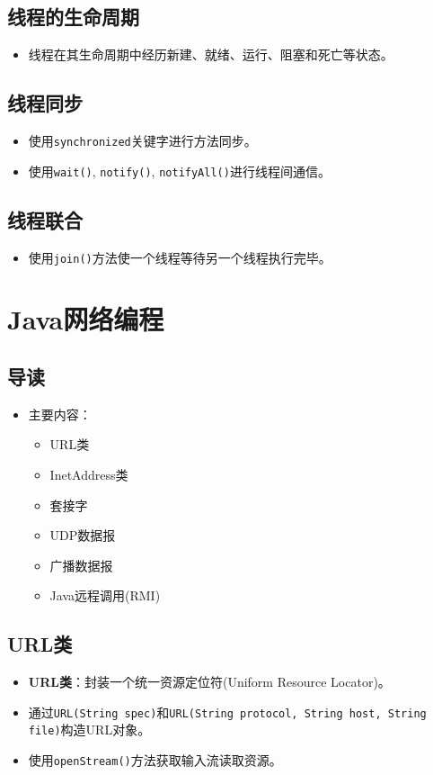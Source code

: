 \documentclass[a4paper, 10pt]{ctexart}
\begin{document}
\subsection{线程的生命周期}
\begin{itemize}
  \item 线程在其生命周期中经历新建、就绪、运行、阻塞和死亡等状态。
\end{itemize}

\subsection{线程同步}
\begin{itemize}
  \item 使用\texttt{synchronized}关键字进行方法同步。
  \item 使用\texttt{wait()}, \texttt{notify()}, \texttt{notifyAll()}进行线程间通信。
\end{itemize}

\subsection{线程联合}
\begin{itemize}
  \item 使用\texttt{join()}方法使一个线程等待另一个线程执行完毕。
\end{itemize}

\section{Java网络编程}

\subsection{导读}
\begin{itemize}
  \item 主要内容：
  \begin{itemize}
    \item URL类
    \item InetAddress类
    \item 套接字
    \item UDP数据报
    \item 广播数据报
    \item Java远程调用(RMI)
  \end{itemize}
\end{itemize}

\subsection{URL类}
\begin{itemize}
  \item \textbf{URL类}：封装一个统一资源定位符(Uniform Resource Locator)。
  \item 通过\texttt{URL(String spec)}和\texttt{URL(String protocol, String host, String file)}构造URL对象。
  \item 使用\texttt{openStream()}方法获取输入流读取资源。
\end{itemize}
\end{document}
